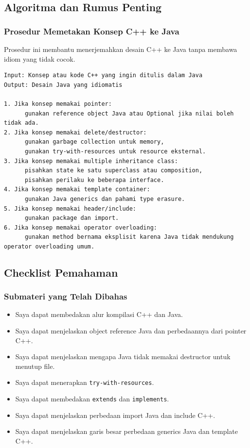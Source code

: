 \subsection{Algoritma dan Rumus Penting}

\subsubsection{Prosedur Memetakan Konsep C++ ke Java}

\begin{jawab}
Prosedur ini membantu menerjemahkan desain C++ ke Java tanpa membawa idiom yang tidak cocok.
\end{jawab}

\begin{lstlisting}[caption={Pseudocode pemetaan konsep C++ ke Java}, label={lst:pemetaan-cpp-java}]
Input: Konsep atau kode C++ yang ingin ditulis dalam Java
Output: Desain Java yang idiomatis

1. Jika konsep memakai pointer:
      gunakan reference object Java atau Optional jika nilai boleh tidak ada.
2. Jika konsep memakai delete/destructor:
      gunakan garbage collection untuk memory,
      gunakan try-with-resources untuk resource eksternal.
3. Jika konsep memakai multiple inheritance class:
      pisahkan state ke satu superclass atau composition,
      pisahkan perilaku ke beberapa interface.
4. Jika konsep memakai template container:
      gunakan Java generics dan pahami type erasure.
5. Jika konsep memakai header/include:
      gunakan package dan import.
6. Jika konsep memakai operator overloading:
      gunakan method bernama eksplisit karena Java tidak mendukung operator overloading umum.
\end{lstlisting}

\subsection{Checklist Pemahaman}

\subsubsection{Submateri yang Telah Dibahas}

\begin{itemize}
    \item[$\square$] Saya dapat membedakan alur kompilasi C++ dan Java.
    \item[$\square$] Saya dapat menjelaskan object reference Java dan perbedaannya dari pointer C++.
    \item[$\square$] Saya dapat menjelaskan mengapa Java tidak memakai destructor untuk menutup file.
    \item[$\square$] Saya dapat menerapkan \texttt{try-with-resources}.
    \item[$\square$] Saya dapat membedakan \texttt{extends} dan \texttt{implements}.
    \item[$\square$] Saya dapat menjelaskan perbedaan import Java dan include C++.
    \item[$\square$] Saya dapat menjelaskan garis besar perbedaan generics Java dan template C++.
\end{itemize}

